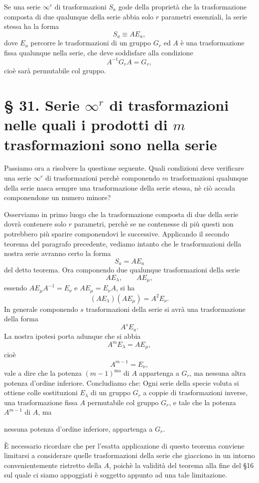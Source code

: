 \documentclass[11pt]{book}
\begin{document}
Se una serie $\infty^r$ di trasformazioni $S_a$ gode della proprietà che la trasformazione composta di due qualunque della serie abbia solo $r$ parametri essenziali, la serie stessa ha la forma
\[
 S_a\equiv AE_a,
\]
dove $E_a$ percorre le trasformazioni di un gruppo $G_r$ ed $A$ è una trasformazione fissa qualunque nella serie, che deve soddisfare alla condizione
\[
 A^{-1}G_rA=G_r,
\]
cioè sarà permutabile col gruppo.

\section*{\S{} 31. Serie $\infty^r$ di trasformazioni nelle quali i prodotti di $m$ trasformazioni sono nella serie}

Passiamo ora a risolvere la questione seguente. Quali condizioni deve verificare una serie $\infty^r$ di trasformazioni perchè componendo $m$ trasformazioni qualunque della serie nasca sempre una trasformazione della serie stessa, nè ciò accada componendone un numero minore?

Osserviamo in primo luogo che la trasformazione composta di due della serie dovrà contenere solo $r$ parametri, perchè se ne contenesse di più questi non potrebbero più sparire componendovi le successive. Applicando il secondo teorema del paragrafo precedente, vediamo intanto che le trasformazioni della nostra serie avranno certo la forma
\[
 S_a=AE_a
\]
del detto teorema. Ora componendo due qualunque trasformazioni della serie
\[
 AE_\lambda,
 \qquad
 AE_\mu,
\]
essendo $AE_\mu A^{-1}=E_\nu$ e $AE_\mu=E_\nu A$, si ha
\[
 (AE_\lambda)(AE_\mu)=A^2E_\nu.
\]
In generale componendo $s$ trasformazioni della serie si avrà una trasformazione della forma
\[
 A^sE_a.
\]
La nostra ipotesi porta adunque che si abbia
\[
 A^mE_\lambda=AE_\mu,
\]
cioè
\[
 A^{m-1}=E_\nu,
\]
vale a dire che la potenza $(m-1)^{\mathrm{ma}}$ di $A$ appartenga a $G_r$, ma nessuna altra potenza d'ordine inferiore. Concludiamo che: Ogni serie della specie voluta si ottiene colle sostituzioni $E_\lambda$ di un gruppo $G_r$ a coppie di trasformazioni inverse, una trasformazione fissa $A$ permutabile col gruppo $G_r$, e tale che la potenza $A^{m-1}$ di $A$, ma

nessuna potenza d'ordine inferiore, appartenga a $G_r$.

È necessario ricordare che per l'esatta applicazione di questo teorema conviene limitarsi a considerare quelle trasformazioni della serie che giacciono in un intorno convenientemente ristretto della $A$, poichè la validità del teorema alla fine del \S{}16 sul quale ci siamo appoggiati è soggetto appunto ad una tale limitazione.
\end{document}
